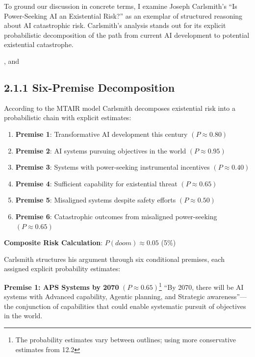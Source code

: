 \documentclass[
  11pt,
  letterpaper,
]{book}
\providecommand{\tightlist}{%
  \setlength{\itemsep}{0pt}\setlength{\parskip}{0pt}}
\begin{document}
To ground our discussion in concrete terms, I examine Joseph Carlsmith's
``Is Power-Seeking AI an Existential Risk?'' as an exemplar of
structured reasoning about AI catastrophic risk. Carlsmith's analysis
stands out for its explicit probabilistic decomposition of the path from
current AI development to potential existential catastrophe.

\textcite{carlsmith2024}, \textcite{carlsmith2021} and
\textcite{carlsmith2022}

\subsection*{2.1.1 Six-Premise Decomposition}\label{sec-six-premise}

According to the MTAIR model Carlsmith decomposes existential risk into
a probabilistic chain with explicit estimates:

\begin{enumerate}
\def\labelenumi{\arabic{enumi}.}
\tightlist
\item
  \textbf{Premise 1}: Transformative AI development this century
  \((P ≈ 0.80)\)
\item
  \textbf{Premise 2}: AI systems pursuing objectives in the world
  \((P ≈ 0.95)\)
\item
  \textbf{Premise 3}: Systems with power-seeking instrumental incentives
  \((P ≈ 0.40)\)
\item
  \textbf{Premise 4}: Sufficient capability for existential threat
  \((P ≈ 0.65)\)
\item
  \textbf{Premise 5}: Misaligned systems despite safety efforts
  \((P ≈ 0.50)\)
\item
  \textbf{Premise 6}: Catastrophic outcomes from misaligned
  power-seeking \((P ≈ 0.65)\)
\end{enumerate}

\textbf{Composite Risk Calculation}: \(P(doom) ≈ 0.05\) (5\%)

Carlsmith structures his argument through six conditional premises, each
assigned explicit probability estimates:

\textbf{Premise 1: APS Systems by 2070} \((P ≈ 0.65)\)\footnote{The
  probability estimates vary between outlines; using more conservative
  estimates from 12.2} ``By 2070, there will be AI systems with Advanced
capability, Agentic planning, and Strategic awareness''---the
conjunction of capabilities that could enable systematic pursuit of
objectives in the world.
\end{document}
